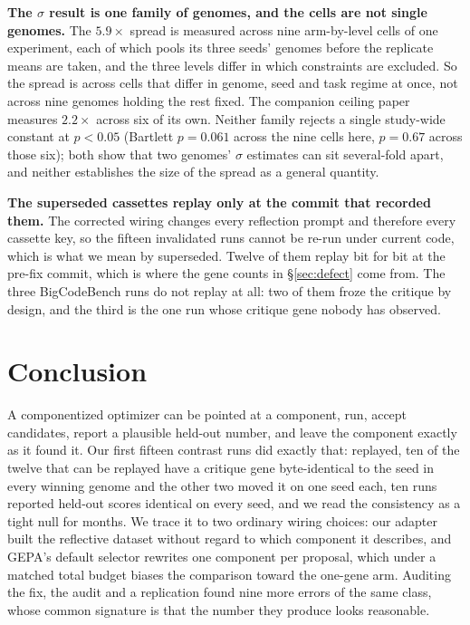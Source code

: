 \documentclass[11pt]{article}
\begin{document}
\textbf{The $\sigma$ result is one family of genomes, and the cells are not single genomes.}
The $5.9\times$ spread is measured across nine arm-by-level cells of one experiment, each of
which pools its three seeds' genomes before the replicate means are taken, and the three levels
differ in which constraints are excluded. So the spread is across cells that differ in genome,
seed and task regime at once, not across nine genomes holding the rest fixed. The companion
ceiling paper measures $2.2\times$ across six of its own. Neither family rejects a single
study-wide constant at $p<0.05$ (Bartlett $p = 0.061$ across the nine cells here, $p = 0.67$ across
those six); both show that two genomes' $\sigma$ estimates can sit several-fold apart, and neither
establishes the size of the spread as a general quantity.

\textbf{The superseded cassettes replay only at the commit that recorded them.} The corrected
wiring changes every reflection prompt and therefore every cassette key, so the fifteen invalidated
runs cannot be re-run under current code, which is what we mean by superseded. Twelve of them
replay bit for bit at the pre-fix commit, which is where the gene counts in \S\ref{sec:defect} come
from. The three BigCodeBench runs do not replay at all: two of them froze the critique by design,
and the third is the one run whose critique gene nobody has observed.

\section{Conclusion}
\label{sec:conclusion}

A componentized optimizer can be pointed at a component, run, accept candidates, report a
plausible held-out number, and leave the component exactly as it found it. Our first fifteen
contrast runs did
exactly that: replayed, ten of the twelve that can be replayed have a critique gene byte-identical
to the seed in every winning genome and the other two moved it on one seed each, ten runs
reported held-out scores identical on every seed, and we read the consistency as a tight null for months. We
trace it to two ordinary wiring choices: our adapter built the reflective dataset without regard to which
component it describes, and GEPA's default selector rewrites one component per proposal, which
under a matched total budget biases the comparison toward the one-gene arm. Auditing the fix, the audit and a
replication found nine more errors of the same class, whose common signature is that the number they produce
looks reasonable.
\end{document}
